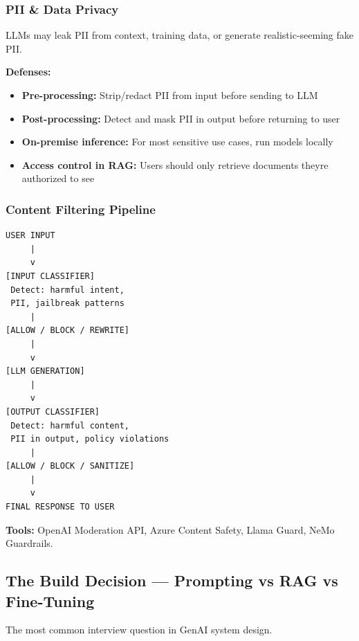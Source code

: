 \documentclass[11pt]{article}
\providecommand{\tightlist}{\setlength{\itemsep}{1pt}\setlength{\parskip}{0pt}}
\begin{document}
\subsubsection{PII \& Data Privacy}\label{pii--data-privacy}

LLMs may leak PII from context, training data, or generate realistic-seeming fake PII.

\textbf{Defenses:}

\begin{itemize}
\tightlist
\item
  \textbf{Pre-processing:} Strip/redact PII from input before sending to LLM
\item
  \textbf{Post-processing:} Detect and mask PII in output before returning to user
\item
  \textbf{On-premise inference:} For most sensitive use cases, run models locally
\item
  \textbf{Access control in RAG:} Users should only retrieve documents they\textquotesingle re authorized to see
\end{itemize}

\subsubsection{Content Filtering Pipeline}\label{content-filtering-pipeline}

\setcodelang{}

\begin{verbatim}
USER INPUT
     |
     v
[INPUT CLASSIFIER]
 Detect: harmful intent,
 PII, jailbreak patterns
     |
[ALLOW / BLOCK / REWRITE]
     |
     v
[LLM GENERATION]
     |
     v
[OUTPUT CLASSIFIER]
 Detect: harmful content,
 PII in output, policy violations
     |
[ALLOW / BLOCK / SANITIZE]
     |
     v
FINAL RESPONSE TO USER
\end{verbatim}

\textbf{Tools:} OpenAI Moderation API, Azure Content Safety, Llama Guard, NeMo Guardrails.

\subsection{The Build Decision --- Prompting vs RAG vs Fine-Tuning}\label{the-build-decision--prompting-vs-rag-vs-fine-tuning}

The most common interview question in GenAI system design.
\end{document}
